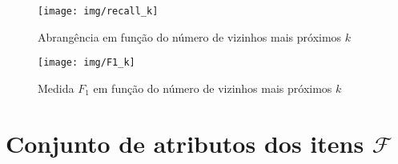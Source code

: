 \begin{figure}[htp]
    \begin{center}
    \texttt{[image: img/recall\_k]}
    \end{center}
    \caption{Abrangência em função do número de vizinhos mais próximos $k$}
    \label{fig:recall_k}
\end{figure}

\begin{figure}[htp]
    \begin{center}
    \texttt{[image: img/F1\_k]}
    \end{center}
    \caption{Medida $F_1$ em função do número de vizinhos mais próximos $k$}
    \label{fig:F1_k}
\end{figure}


\section{Conjunto de atributos dos itens
 $\mathcal{F}$} %
\label{sec:conjunto_de_atributos_dos_itens_}

